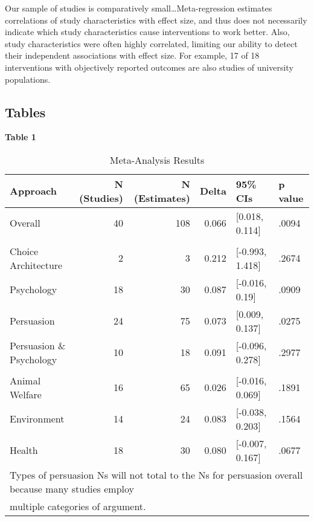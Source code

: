\documentclass[sn-nature,referee,pdflatex]{sn-jnl}
\begin{document}
Our sample of studies is comparatively small\ldots Meta-regression
estimates correlations of study characteristics with effect size, and
thus does not necessarily indicate which study characteristics cause
interventions to work better. Also, study characteristics were often
highly correlated, limiting our ability to detect their independent
associations with effect size. For example, 17 of 18 interventions with
objectively reported outcomes are also studies of university
populations.

\subsection{Tables}\label{tables}

\textbf{Table 1}

\begin{table}

\caption{\label{tab:table_one}Meta-Analysis Results}
\centering
\begin{tabular}[t]{lrrrll}
\toprule
Approach & N (Studies) & N (Estimates) & Delta & 95\% CIs & p value\\
\midrule
Overall & 40 & 108 & 0.066 & {}[0.018, 0.114] & .0094\\
\addlinespace[0.5em]
\multicolumn{6}{l}{\textbf{Theory}}\\
\hspace{1em}Choice Architecture & 2 & 3 & 0.212 & {}[-0.993, 1.418] & .2674\\
\hspace{1em}Psychology & 18 & 30 & 0.087 & {}[-0.016, 0.19] & .0909\\
\hspace{1em}Persuasion & 24 & 75 & 0.073 & {}[0.009, 0.137] & .0275\\
\hspace{1em}Persuasion \& Psychology & 10 & 18 & 0.091 & {}[-0.096, 0.278] & .2977\\
\addlinespace[0.5em]
\multicolumn{6}{l}{\textbf{Type of Persuasion}}\\
\hspace{1em}Animal Welfare & 16 & 65 & 0.026 & {}[-0.016, 0.069] & .1891\\
\hspace{1em}Environment & 14 & 24 & 0.083 & {}[-0.038, 0.203] & .1564\\
\hspace{1em}Health & 18 & 30 & 0.080 & {}[-0.007, 0.167] & .0677\\
\bottomrule
\multicolumn{6}{l}{\textsuperscript{} Types of persuasion Ns will not total to the Ns for persuasion overall because many studies employ}\\
\multicolumn{6}{l}{multiple categories of argument.}\\
\end{tabular}
\end{table}
\end{document}
